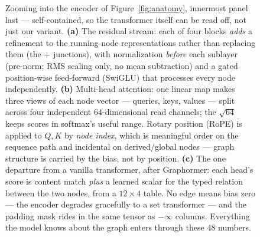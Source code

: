\documentclass[11pt]{article}
\begin{document}
\begin{figure}[htbp]
{}
\caption{Zooming into the encoder of Figure~\ref{fig:anatomy}, innermost panel last ---
self-contained, so the transformer itself can be read off, not just our variant.
\textbf{(a)} The residual stream: each of four blocks \emph{adds} a refinement to the
running node representations rather than replacing them (the $+$ junctions), with
normalization \emph{before} each sublayer (pre-norm; RMS scaling only, no mean
subtraction) and a gated position-wise feed-forward (SwiGLU) that processes every node
independently. \textbf{(b)} Multi-head attention: one linear map makes three views of
each node vector --- queries, keys, values --- split across four independent
$64$-dimensional read channels; the $\sqrt{64}$ keeps scores in softmax's useful range.
Rotary position (RoPE) is applied to $Q,K$ by \emph{node index}, which is meaningful
order on the sequence path and incidental on derived/global nodes --- graph structure is
carried by the bias, not by position. \textbf{(c)} The one departure from a vanilla
transformer, after Graphormer: each head's score is content match \emph{plus} a learned
scalar for the typed relation between the two nodes, from a $12\times 4$ table. No edge
means bias zero --- the encoder degrades gracefully to a set transformer --- and the
padding mask rides in the same tensor as $-\infty$ columns. Everything the model knows
about the graph enters through these $48$ numbers.}
\label{fig:encoderzoom}
\end{figure}
\end{document}

